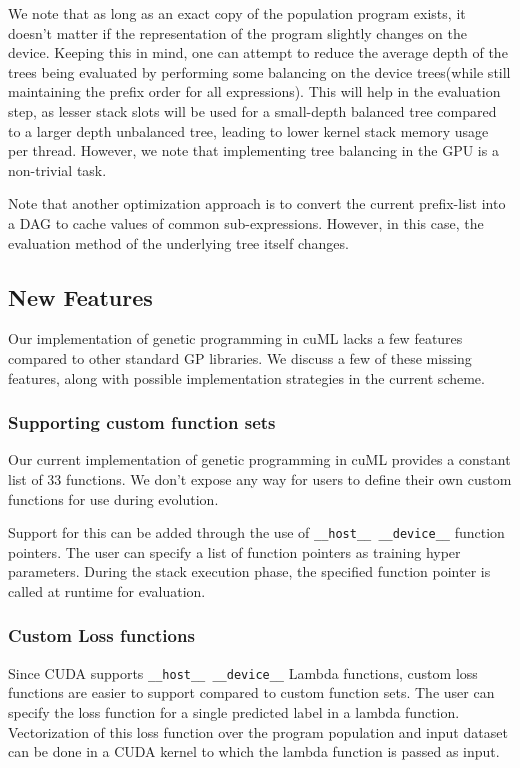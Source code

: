 We note that as long as an exact copy of the population program exists, it doesn't matter if the representation of the program slightly changes on the device. Keeping this in mind, one can attempt to reduce the average depth of the trees being evaluated by performing some balancing on the device trees(while still maintaining the prefix order for all expressions). This will help in the evaluation step, as lesser stack slots will be used for a small-depth balanced tree compared to a larger depth unbalanced tree, leading to lower kernel stack memory usage per thread. However, we note that implementing tree balancing in the GPU is a non-trivial task.

Note that another optimization approach is to convert the current prefix-list into a DAG to cache values of common sub-expressions. However, in this case, the evaluation method of the underlying tree itself changes. 

\subsection{New Features}
\label{subsec:newfeatures}

Our implementation of genetic programming in cuML lacks a few features compared to other standard GP libraries. We discuss a few of these missing features, along with possible implementation strategies in the current scheme. 

\subsubsection{Supporting custom function sets}
Our current implementation of genetic programming in cuML provides a constant list of $33$ functions. We don't expose any way for users to define their own custom functions for use during evolution. 

Support for this can be added through the use of \lstinline!__host__ __device__! function pointers. The user can specify a list of function pointers as training hyper parameters. During the stack execution phase, the specified function pointer is called at runtime for evaluation.

\subsubsection{Custom Loss functions}

Since CUDA supports \lstinline!__host__ __device__! Lambda functions, custom loss functions are easier to support compared to custom function sets. The user can specify the loss function for a single predicted label in a lambda function. Vectorization of this loss function over the program population and input dataset can be done in a CUDA kernel to which the lambda function is passed as input. 
